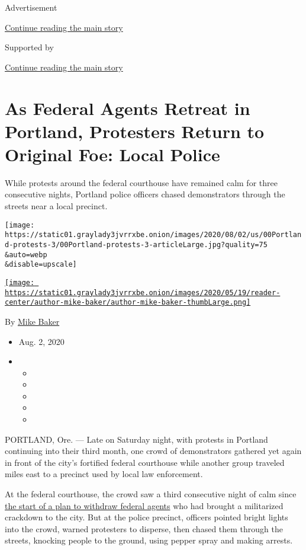 Advertisement

\protect\hyperlink{after-top}{Continue reading the main story}

Supported by

\protect\hyperlink{after-sponsor}{Continue reading the main story}

\hypertarget{as-federal-agents-retreat-in-portland-protesters-return-to-original-foe-local-police}{%
\section{As Federal Agents Retreat in Portland, Protesters Return to
Original Foe: Local
Police}\label{as-federal-agents-retreat-in-portland-protesters-return-to-original-foe-local-police}}

While protests around the federal courthouse have remained calm for
three consecutive nights, Portland police officers chased demonstrators
through the streets near a local precinct.

\texttt{[image: https://static01.graylady3jvrrxbe.onion/images/2020/08/02/us/00Portland-protests-3/00Portland-protests-3-articleLarge.jpg?quality=75\\\&auto=webp\\\&disable=upscale]}

\href{https://www.nytimes3xbfgragh.onion/by/mike-baker}{\texttt{[image: https://static01.graylady3jvrrxbe.onion/images/2020/05/19/reader-center/author-mike-baker/author-mike-baker-thumbLarge.png]}}

By \href{https://www.nytimes3xbfgragh.onion/by/mike-baker}{Mike Baker}

\begin{itemize}
\item
  Aug. 2, 2020
\item
  \begin{itemize}
  \item
  \item
  \item
  \item
  \item
  \end{itemize}
\end{itemize}

PORTLAND, Ore. --- Late on Saturday night, with protests in Portland
continuing into their third month, one crowd of demonstrators gathered
yet again in front of the city's fortified federal courthouse while
another group traveled miles east to a precinct used by local law
enforcement.

At the federal courthouse, the crowd saw a third consecutive night of
calm since
\href{https://www.nytimes3xbfgragh.onion/2020/07/29/us/protests-portland-federal-withdrawal.html}{the
start of a plan to withdraw federal agents} who had brought a
militarized crackdown to the city. But at the police precinct, officers
pointed bright lights into the crowd, warned protesters to disperse,
then chased them through the streets, knocking people to the ground,
using pepper spray and making arrests.

